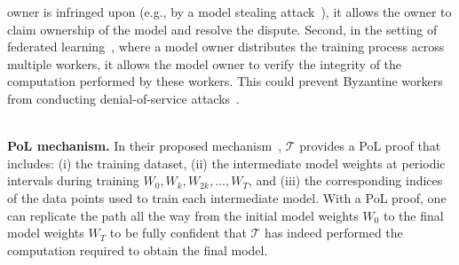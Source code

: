 \documentclass[conference]{IEEEtran}
\newcommand{\Prov}{\mathcal{T}\xspace}
\newcommand{\Paragraph}[1]{~\vspace*{-0.8\baselineskip}\\{\bf #1}}
\begin{document}
owner is infringed upon (e.g., by a {model\EndAccSupp{}} stealing attack~\cite{tramer2016stealing, wang2018stealing, orekondy2019knockoff}),
it allows the owner to claim {ownership\EndAccSupp{}} of the {model\EndAccSupp{}} and resolve the dispute.
Second, in the {setting\EndAccSupp{}} of federated learning~\cite{mcmahan17a}, where a {model\EndAccSupp{}} owner distributes the {training\EndAccSupp{}} {process\EndAccSupp{}} across multiple workers, it allows the {model\EndAccSupp{}} owner to verify the integrity of the {computation\EndAccSupp{}} performed by these workers.
This could prevent {Byzantine\EndAccSupp{}} {workers\EndAccSupp{}} from conducting denial-of-service attacks~\cite{NIPS2017_f4b9ec30}.


\Paragraph{PoL mechanism.}
In their proposed mechanism~\cite{PoL}, 
$\Prov$ provides a PoL proof that includes:
(i) the {training\EndAccSupp{}} dataset,
(ii) the intermediate {model\EndAccSupp{}} {weights\EndAccSupp{}} at periodic intervals during training $W_0, W_k, W_{2k}, ..., W_{T}$, and 
(iii) the {corresponding\EndAccSupp{}} indices of the {data\EndAccSupp{}} points {used\EndAccSupp{}} to train each intermediate model.
With a PoL proof, one can replicate the path all the way from the {initial\EndAccSupp{}} {model\EndAccSupp{}} {weights\EndAccSupp{}} $W_0$ to the final {model\EndAccSupp{}} weights $W_T$ to be fully confident that $\Prov$ has indeed performed the {computation\EndAccSupp{}} {required\EndAccSupp{}} to obtain the final model.
\end{document}
